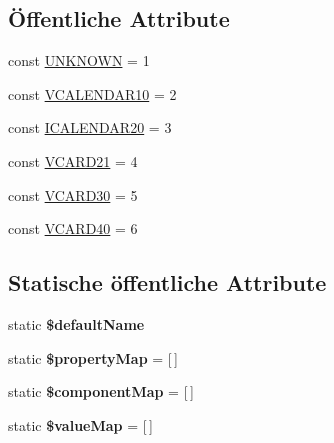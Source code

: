 \subsection*{Öffentliche Attribute}
\begin{DoxyCompactItemize}
\item 
const \mbox{\hyperlink{class_sabre_1_1_v_object_1_1_document_a5e8fe2b5a5107495924f84e28793cf54}{U\+N\+K\+N\+O\+WN}} = 1
\item 
const \mbox{\hyperlink{class_sabre_1_1_v_object_1_1_document_abcff078283beb9fb80f260288fb8db15}{V\+C\+A\+L\+E\+N\+D\+A\+R10}} = 2
\item 
const \mbox{\hyperlink{class_sabre_1_1_v_object_1_1_document_a92a69a1be5aa5b3a714c7840c2db1ccd}{I\+C\+A\+L\+E\+N\+D\+A\+R20}} = 3
\item 
const \mbox{\hyperlink{class_sabre_1_1_v_object_1_1_document_a9bf39e799fa7116f9b599085c76097c2}{V\+C\+A\+R\+D21}} = 4
\item 
const \mbox{\hyperlink{class_sabre_1_1_v_object_1_1_document_a5103d6dcd6e9040808f2b30c1ccad9c1}{V\+C\+A\+R\+D30}} = 5
\item 
const \mbox{\hyperlink{class_sabre_1_1_v_object_1_1_document_afa0952010d5ee8ba17096eba3ade6751}{V\+C\+A\+R\+D40}} = 6
\end{DoxyCompactItemize}
\subsection*{Statische öffentliche Attribute}
\begin{DoxyCompactItemize}
\item 
\mbox{\label{class_sabre_1_1_v_object_1_1_document_af3cb86a17691cd526488bb1b32ec7c01}} 
static {\bfseries \$default\+Name}
\item 
\mbox{\label{class_sabre_1_1_v_object_1_1_document_a41a11f42813a81769cfe285e4688a4b2}} 
static {\bfseries \$property\+Map} = \mbox{[}$\,$\mbox{]}
\item 
\mbox{\label{class_sabre_1_1_v_object_1_1_document_a82ed6334035f6493903b75127e089083}} 
static {\bfseries \$component\+Map} = \mbox{[}$\,$\mbox{]}
\item 
\mbox{\label{class_sabre_1_1_v_object_1_1_document_ada70fe952041983b20110482f57fb34c}} 
static {\bfseries \$value\+Map} = \mbox{[}$\,$\mbox{]}
\end{DoxyCompactItemize}
